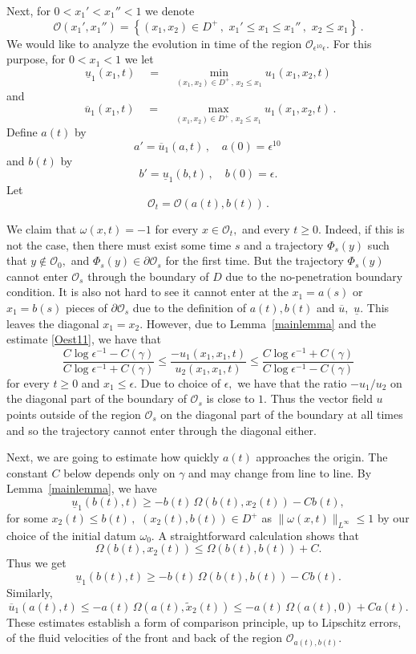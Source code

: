 \documentclass[reqno,centertags, 11pt]{amsart}
\newcommand{\be}{\mathbf e} \newcommand{\bh}{\mathbf h}
\newcommand{\lb}{\label}
\renewcommand{\be}{\begin{equation}}
\newcommand{\ee}{\end{equation}}
\newcommand{\om}{\omega}
\newcommand{\OO}{\mathcal O}
\begin{document}
Next, for $0<x_1'<x_1''<1$ we  denote
\be\lb{xx1}
\OO(x_1',x_1'')=\left\{
(x_1,x_2)\in D^+\,,\,\,x_1' \leq x_1 \leq x_1''\,,\,\,
x_2 \leq x_1\right\}\,.
\ee
We would like to analyze the evolution in time of the region $\OO_{\epsilon^{10}\epsilon}.$
For this purpose, for $0<x_1<1$ we let
\be\lb{xx2}
{\underline u}_1(x_1,t) \quad =\quad  \min_{(x_1,x_2)\in D^+\,,\,x_2 \leq x_1} u_1(x_1,x_2,t)
\ee
and
\be\lb{xx3}
\,\,{\overline u}_1(x_1,t) \quad = \quad \max_{(x_1,x_2)\in D^+\,,\, x_2 \leq x_1} u_1(x_1,x_2,t)\,.
\ee
Define
$a(t)$ by
\be\lb{xx4}
a'= \overline u_1(a,t)\,,\quad a(0)=\epsilon^{10}\,
\ee
and  $b(t)$  by
\be\lb{xx5}
b' = \underline u_1(b,t)\,,\quad b(0)=\epsilon.
\ee
Let
\be\lb{xx6}
\OO_t=\OO(a(t),b(t))\,.
\ee

We claim that $\omega(x,t)=-1$ for every $x \in \OO_t,$ and every $t \geq 0.$ Indeed, if this is not the case, then there must exist
some time $s$ and a trajectory $\Phi_s(y)$ such that $y \notin \OO_0,$ and $\Phi_s(y) \in \partial \OO_s$
for the first time. But the trajectory $\Phi_s(y)$ cannot enter $\OO_s$ through the boundary of $D$ due to the no-penetration boundary condition.
It is also not hard to see it cannot enter at the $x_1=a(s)$ or $x_1=b(s)$ pieces of $\partial \OO_s$ due to the definition of
$a(t),b(t)$ and $\overline u,$ $\underline u.$ This leaves the diagonal $x_1=x_2.$ However, due to Lemma~\ref{mainlemma} and the estimate
\eqref{Oest11}, we have that
\be\lb{diag1}
\frac{C\log \epsilon^{-1} - C(\gamma)}{C\log \epsilon^{-1} + C(\gamma)} \leq \frac{-u_1(x_1,x_1,t)}{u_2(x_1,x_1,t)} \leq \frac{C\log \epsilon^{-1} + C(\gamma)}
{C\log \epsilon^{-1} - C(\gamma)}
\ee
for every $t \geq 0$ and $x_1 \leq \epsilon.$ Due to choice of $\epsilon,$ we have that the ratio $-u_1/u_2$ on the diagonal part of the boundary of $\OO_s$
is close to $1$. Thus the vector field $u$ points outside of the region $\OO_s$ on the diagonal part of the boundary
at all times and so the trajectory cannot enter through the diagonal either.

Next, we are going to estimate how quickly $a(t)$ approaches the origin. The constant $C$ below depends only on $\gamma$ and may change from line to line.
By Lemma~\ref{mainlemma}, we have
\[ \underline u_1(b(t),t) \geq  -b(t)\, \Omega(b(t), x_2(t))-Cb(t), \]
for some $x_2(t)\le b(t)\,,\,\,(x_2(t),b(t))\in  D^+$
as  $\|\omega(x,t)\|_{L^\infty} \leq 1$ by our choice of the initial datum $\om_0$.
A straightforward calculation shows that \[ \Omega(b(t), x_2(t)) \leq \Omega(b(t), b(t)) + C. \]
Thus we get
\begin{equation}\label{keyestCD}
\underline u_1(b(t),t) \geq -b(t)\, \Omega(b(t),b(t))-Cb(t).
\end{equation}
Similarly,
\[ \overline u_1(a(t),t) \leq -a(t) \,\Omega(a(t), \tilde x_2 (t)) \leq -a(t) \,\Omega(a(t), 0)+Ca(t). \]
These estimates establish a form of comparison principle, up to Lipschitz errors, of the fluid velocities of the front and
back of the region $\OO_{a(t),b(t)}.$
\end{document}

